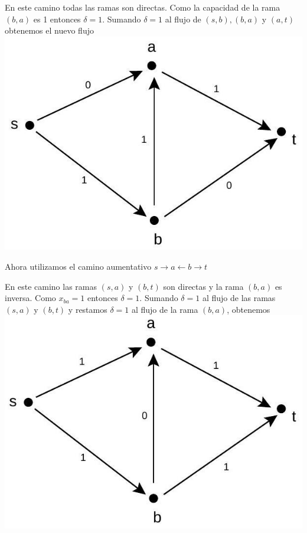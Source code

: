 \documentclass[10pt]{article}
\begin{document}
En este camino todas las ramas son directas. Como la capacidad de la rama $(b, a)$ es 1 entonces $\delta=1$. Sumando $\delta=1$ al flujo de $(s, b),(b, a)$ y $(a, t)$ obtenemos el nuevo flujo\\
\includegraphics[max width=\textwidth, center]{2025_09_05_aa5f7b8425e7dd302062g-12(1)}

Ahora utilizamos el camino aumentativo $s \longrightarrow a \longleftarrow b \longrightarrow t$

En este camino las ramas $(s, a)$ y $(b, t)$ son directas y la rama $(b, a)$ es inversa. Como $x_{b a}=1$ entonces $\delta=1$. Sumando $\delta=1$ al flujo de las ramas $(s, a)$ y $(b, t)$ y restamos $\delta=1$ al flujo de la rama $(b, a)$, obtenemos\\
\includegraphics[max width=\textwidth, center]{2025_09_05_aa5f7b8425e7dd302062g-13(2)}
\end{document}
